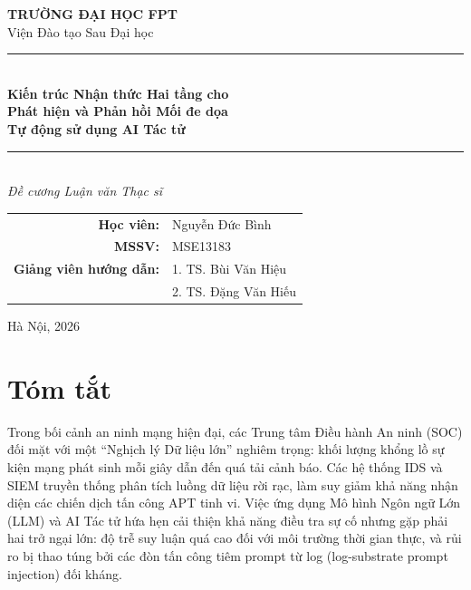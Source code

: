 \documentclass[12pt,a4paper]{article}
\begin{document}

\begin{titlepage}
    \centering

    \vspace*{1cm}
    {\large\textbf{TRƯỜNG ĐẠI HỌC FPT}}\\[0.3cm]
    {\normalsize Viện Đào tạo Sau Đại học}\\[2cm]

    \rule{\textwidth}{0.5pt}\\[0.5cm]
    {\LARGE\textbf{Kiến trúc Nhận thức Hai tầng cho\\Phát hiện và Phản hồi Mối đe dọa\\Tự động sử dụng AI Tác tử}}\\[0.5cm]
    \rule{\textwidth}{0.5pt}\\[1cm]

    {\large\textit{Đề cương Luận văn Thạc sĩ}}\\[2cm]

    \begin{tabular}{rl}
        \textbf{Học viên:}             & Nguyễn Đức Bình \\
        \textbf{MSSV:}                 & MSE13183        \\[0.5cm]
        \textbf{Giảng viên hướng dẫn:} & 1. TS. Bùi Văn Hiệu   \\
                                       & 2. TS. Đặng Văn Hiếu  \\
    \end{tabular}

    \vfill
    {\normalsize Hà Nội, 2026}

\end{titlepage}

\newpage
{}
\section*{Tóm tắt}
Trong bối cảnh an ninh mạng hiện đại, các Trung tâm Điều hành An ninh (SOC) đối mặt với một ``Nghịch lý Dữ liệu lớn'' nghiêm trọng: khối lượng khổng lồ sự kiện mạng phát sinh mỗi giây dẫn đến quá tải cảnh báo. Các hệ thống IDS và SIEM truyền thống phân tích luồng dữ liệu rời rạc, làm suy giảm khả năng nhận diện các chiến dịch tấn công APT tinh vi. Việc ứng dụng Mô hình Ngôn ngữ Lớn (LLM) và AI Tác tử hứa hẹn cải thiện khả năng điều tra sự cố nhưng gặp phải hai trở ngại lớn: độ trễ suy luận quá cao đối với môi trường thời gian thực, và rủi ro bị thao túng bởi các đòn tấn công tiêm prompt từ log (log-substrate prompt injection) đối kháng.
\end{document}
